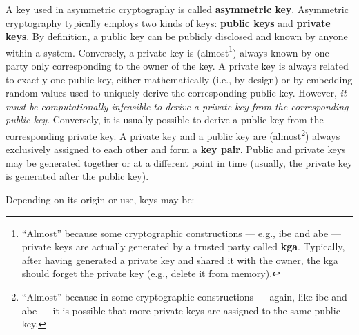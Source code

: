 A key used in asymmetric cryptography is called \textbf{asymmetric key}. Asymmetric cryptography typically employs two kinds of keys: \textbf{public keys} and \textbf{private keys}. By definition, a public key can be publicly disclosed and known by anyone within a system. Conversely, a private key is (almost\footnote{``Almost'' because some cryptographic constructions --- e.g., \gls{ibe}
and \gls{abe} 
--- private keys are actually generated by a trusted party called \textbf{\gls{kga}}. Typically, after having generated a private key and shared it with the owner, the \gls{kga} should forget the private key (e.g., delete it from memory).}) always known by one party only corresponding to the owner of the key. A private key is always related to exactly one public key, either mathematically (i.e., by design) or by embedding random values used to uniquely derive the corresponding public key. However, \textit{it must be computationally infeasible to derive a private key from the corresponding public key}. Conversely, it is usually possible to derive a public key from the corresponding private key. A private key and a public key are (almost\footnote{``Almost'' because in some cryptographic constructions --- again, like \gls{ibe} and \gls{abe} --- it is possible that more private keys are assigned to the same public key.}) always exclusively assigned to each other and form a \textbf{key pair}. Public and private keys may be generated together or at a different point in time (usually, the private key is generated after the public key).

Depending on its origin or use, keys may be:

